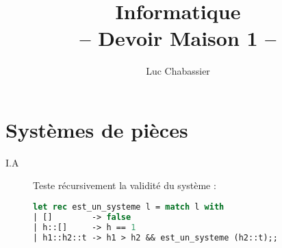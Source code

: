 \documentclass{article}
\title{Informatique\\-- Devoir Maison 1 --}
\author{Luc Chabassier}
\begin{document}
\maketitle
\section{Systèmes de pièces}
\begin{description}
    \item[I.A] Teste récursivement la validité du système :
        \begin{lstlisting}[language=Caml]
let rec est_un_systeme l = match l with
| []        -> false
| h::[]     -> h == 1
| h1::h2::t -> h1 > h2 && est_un_systeme (h2::t);;
        \end{lstlisting}
\end{description}
\end{document}
